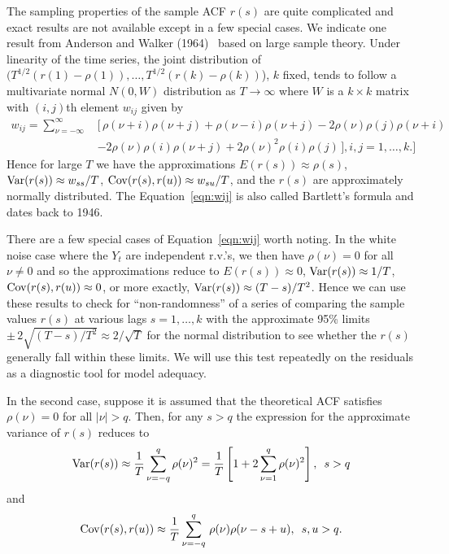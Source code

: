 The sampling properties of the sample ACF $r(s)$ are quite complicated and exact results are not available except in a few special cases. We indicate one result from Anderson and Walker (1964)~\cite{anderwalk} based on large sample theory. Under linearity of the time series, the joint distribution of $(T^{1/2}(r(1)-\rho(1)),\ldots,T^{1/2}(r(k)-\rho(k))$), $k$ fixed, tends to follow a multivariate normal $N(0, W)$ distribution as $T \rightarrow \infty$ where $W$ is a $k \times k$ matrix with $(i,j)$th element $w_{ij}$ given by
	\begin{equation} \label{eqn:wij}
	\begin{split}
            w_{ij}= \sum_{\nu= -\infty}^\infty \,& [\, \rho(\nu+i)\rho(\nu+j) + \rho(\nu-i)\rho(\nu+j) - 2 \rho(\nu)\rho(j)\rho(\nu+i)  \\
                     &- 2 \rho(\nu)\rho(i)\rho(\nu+j) + 2 \rho(\nu)^2 \rho(i)\rho(j) \, ],  i, j= 1,\ldots, k. ]
        \end{split}
	\end{equation}
Hence for large $T$ we have the approximations $E(r(s)) \approx \rho(s)$, $\operatorname{Var}(r(s)) \approx w_{ss}/T$, $\operatorname{Cov}(r(s), r(u)) \approx w_{su}/T$, and the $r(s)$ are approximately normally distributed. The Equation~\ref{eqn:wij} is also called Bartlett's formula and dates back to 1946.


There are a few special cases of Equation~\ref{eqn:wij} worth noting. In the white noise case where the $Y_t$ are independent r.v.'s, we then have $\rho(\nu)=0$ for all $\nu \neq 0$ and so the approximations reduce to $E(r(s)) \approx 0$, $\operatorname{Var}(r(s)) \approx 1/T$, $\operatorname{Cov}(r(s), r(u)) \approx 0$, or more exactly, $\operatorname{Var}(r(s)) \approx (T-s)/T^2$. Hence we can use these results to check for ``non-randomness'' of a series of comparing the sample values $r(s)$ at various lags $s=1, \ldots, k$ with the approximate 95\% limits $\pm \, 2 \sqrt{(T-s)/T^2} \approx 2 / \sqrt{T}$ for the normal distribution to see whether the $r(s)$ generally fall within these limits. We will use this test repeatedly on the residuals as a diagnostic tool for model adequacy. 


In the second case, suppose it is assumed that the theoretical ACF satisfies $\rho(\nu) = 0$ for all $|\nu| > q$.  Then, for any $s>q$ the expression for the approximate variance of $r(s)$ reduces to
	\begin{equation}\label{eqn:varrs}
	\Var(r(s)) \approx \dfrac{1}{T} \sum_{\nu=-q}^q \rho(\nu)^2= \dfrac{1}{T} \left[ 1+ 2 \sum_{\nu=1}^q \rho(\nu)^2 \right], \enskip s>q 
	\end{equation}        
and
	\[
	\operatorname{Cov}(r(s), r(u))\approx \frac{1}{T} \sum_{\nu = -q}^{q} \, \rho(\nu) \rho(\nu -s+u),\enskip s, u > q.
	 \]

